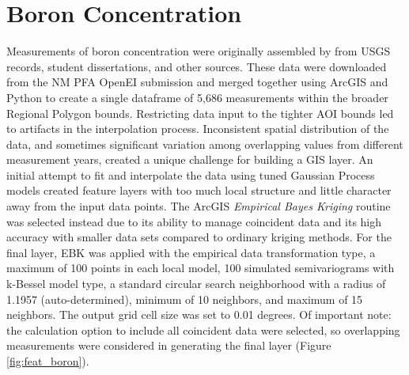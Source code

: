 \section{Boron Concentration}\label{app:dl_boron}
Measurements of boron concentration were originally assembled by \citet{bielicki_hydrogeolgic_2015} from USGS records, student dissertations, and other sources. These data were downloaded from the NM PFA OpenEI submission \citep{kelley_geothermal_2015} and merged together using ArcGIS and Python to create a single dataframe of 5,686 measurements within the broader Regional Polygon bounds. Restricting data input to the tighter AOI bounds led to artifacts in the interpolation process. Inconsistent spatial distribution of the data, and sometimes significant variation among overlapping values from different measurement years, created a unique challenge for building a GIS layer. An initial attempt to fit and interpolate the data using tuned Gaussian Process models created feature layers with too much local structure and little character away from the input data points. The ArcGIS \textit{Empirical Bayes Kriging} routine was selected instead due to its ability to manage coincident data and its high accuracy with smaller data sets compared to ordinary kriging methods. For the final layer, EBK was applied with the empirical data transformation type, a maximum of 100 points in each local model, 100 simulated semivariograms with k-Bessel model type, a standard circular search neighborhood with a radius of 1.1957 (auto-determined), minimum of 10 neighbors, and maximum of 15 neighbors. The output grid cell size was set to 0.01 degrees. Of important note: the calculation option to include all coincident data were selected, so overlapping measurements were considered in generating the final layer (Figure \ref{fig:feat_boron}).
\vfill
\pagebreak

